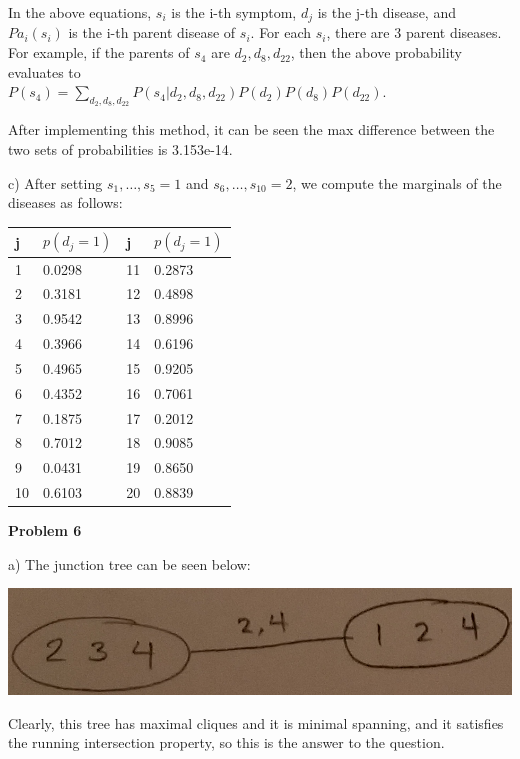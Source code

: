 \documentclass[12pt]{article}
\begin{document}
In the above equations, $s_i$ is the i-th symptom, $d_j$ is the j-th disease, and $Pa_i(s_i)$ is the i-th parent disease of $s_i$. For each $s_i$, there are 3 parent diseases. For example, if the parents of $s_4$ are $d_2, d_8, d_{22}$, then the above probability evaluates to \\$P(s_4) = \sum_{d_2, d_8, d_{22}} P(s_4 \vert d_2, d_8, d_{22})P(d_2)P(d_8)P(d_{22})$.

After implementing this method, it can be seen the max difference between the two sets of probabilities is 3.153e-14.

\pagebreak c) After setting $s_1, \dots, s_5 = 1$ and $s_6, \dots, s_{10} = 2$, we compute the marginals of the diseases as follows:

\begin{table}[h]
	\begin{tabular}{|l|l|l|l|}
		\hline
		j  & $p(d_j = 1)$ & j & $p(d_j = 1)$ \\ \hline
		1  & 0.0298 & 11 & 0.2873 \\ \hline
		2  & 0.3181 & 12 & 0.4898 \\ \hline
		3  & 0.9542 & 13 & 0.8996 \\ \hline
		4  & 0.3966 & 14 & 0.6196 \\ \hline
		5  & 0.4965 & 15 & 0.9205 \\ \hline
		6  & 0.4352 & 16 & 0.7061 \\ \hline
		7  & 0.1875 & 17 & 0.2012 \\ \hline
		8  & 0.7012 & 18 & 0.9085 \\ \hline
		9  & 0.0431 & 19 & 0.8650 \\ \hline
		10 & 0.6103 & 20 & 0.8839 \\ \hline
	\end{tabular}
\end{table}

\pagebreak\textbf{Problem 6}

a) The junction tree can be seen below:

\includegraphics[scale=0.5]{q6-junctiontree-general}

Clearly, this tree has maximal cliques and it is minimal spanning, and it satisfies the running intersection property, so this is the answer to the question.
\end{document}

